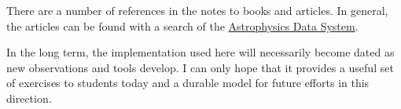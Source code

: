 \documentclass[11pt, preprint, maxnames=9]{aastex}
\begin{document}
There are a number of references in the notes to books and
articles. In general, the articles can be found with a search of the
\href{https://ui.adsabs.harvard.edu}{Astrophysics Data System}.

In the long term, the implementation used here will necessarily become
dated as new observations and tools develop. I can only hope that it
provides a useful set of exercises to students today and a durable
model for future efforts in this direction.
\end{document}

